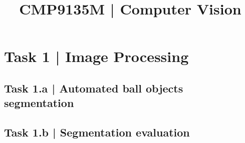 \documentclass[conference]{IEEEtran}
\begin{document}
\title{CMP9135M | Computer Vision}

\author{
}

\maketitle

\begin{abstract}
\end{abstract}

\begin{IEEEkeywords}
\end{IEEEkeywords}

\section*{Task 1 | Image Processing}

\subsection*{Task 1.a | Automated ball objects segmentation}

\subsection*{Task 1.b | Segmentation evaluation}
\end{document}

